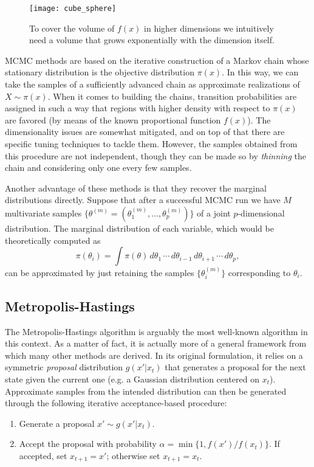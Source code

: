 \begin{figure}[ht!]
  \centering
  \texttt{[image: cube\_sphere]}
  \caption{To cover the volume of \(f(x)\) in higher dimensions we intuitively need a volume that grows exponentially with the dimension itself.}\label{fig:curse_dimensionality}
\end{figure}

MCMC methods are based on the iterative construction of a Markov chain whose stationary distribution is the objective distribution \(\pi(x)\). In this way, we can take the samples of a sufficiently advanced chain as approximate realizations of \(X\sim \pi(x)\). When it comes to building the chains, transition probabilities are assigned in such a way that regions with higher density with respect to \(\pi(x)\) are favored (by means of the known proportional function \(f(x)\)). The dimensionality issues are somewhat mitigated, and on top of that there are specific tuning techniques to tackle them. However, the samples obtained from this procedure are not independent, though they can be made so by \textit{thinning} the chain and considering only one every few samples.

Another advantage of these methods is that they recover the marginal distributions directly. Suppose that after a successful MCMC run we have \(M\) multivariate samples \(\{\theta^{(m)}=(\theta_1^{(m)},\dots, \theta_p^{(m)})\}\) of a joint \(p\)-dimensional distribution. The marginal distribution of each variable, which would be theoretically computed as
\[
\pi(\theta_i) = \int \pi(\theta)\,d\theta_1\,\cdots\,d\theta_{i-1}\,d\theta_{i+1}\,\cdots \,d\theta_p,
\]
can be approximated by just retaining the samples \(\{\theta_i^{(m)}\}\) corresponding to \(\theta_i\).

\subsection*{Metropolis-Hastings}

The Metropolis-Hastings algorithm \citep{metropolis1953equation} is arguably the most well-known algorithm in this context. As a matter of fact, it is actually more of a general framework from which many other methods are derived. In its original formulation, it relies on a symmetric \textit{proposal} distribution \(g(x'|x_t)\) that generates a proposal for the next state given the current one (e.g. a Gaussian distribution centered on \(x_t\)). Approximate samples from the intended distribution can then be generated through the following iterative acceptance-based procedure:
\begin{enumerate}[1.]
  \item Generate a proposal \(x' \sim g(x'|x_t)\).
  \item Accept the proposal with probability \(\alpha=\min\{1, f(x')/f(x_t)\}\). If accepted, set \(x_{t+1}=x'\); otherwise set \(x_{t+1}=x_t\).
\end{enumerate}

